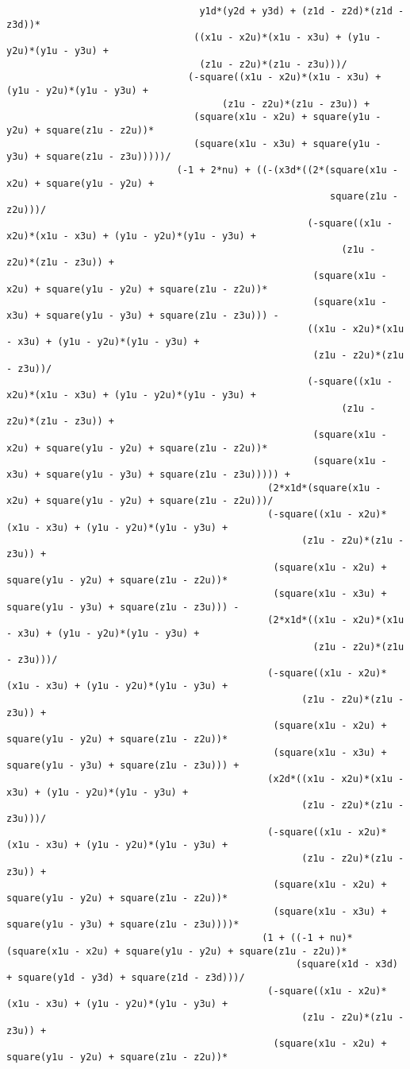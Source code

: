 \begin{lstlisting}
								  y1d*(y2d + y3d) + (z1d - z2d)*(z1d - z3d))*
								 ((x1u - x2u)*(x1u - x3u) + (y1u - y2u)*(y1u - y3u) + 
								  (z1u - z2u)*(z1u - z3u)))/
								(-square((x1u - x2u)*(x1u - x3u) + (y1u - y2u)*(y1u - y3u) + 
									  (z1u - z2u)*(z1u - z3u)) + 
								 (square(x1u - x2u) + square(y1u - y2u) + square(z1u - z2u))*
								 (square(x1u - x3u) + square(y1u - y3u) + square(z1u - z3u)))))/
							  (-1 + 2*nu) + ((-(x3d*((2*(square(x1u - x2u) + square(y1u - y2u) + 
														 square(z1u - z2u)))/
													 (-square((x1u - x2u)*(x1u - x3u) + (y1u - y2u)*(y1u - y3u) + 
														   (z1u - z2u)*(z1u - z3u)) + 
													  (square(x1u - x2u) + square(y1u - y2u) + square(z1u - z2u))*
													  (square(x1u - x3u) + square(y1u - y3u) + square(z1u - z3u))) - 
													 ((x1u - x2u)*(x1u - x3u) + (y1u - y2u)*(y1u - y3u) + 
													  (z1u - z2u)*(z1u - z3u))/
													 (-square((x1u - x2u)*(x1u - x3u) + (y1u - y2u)*(y1u - y3u) + 
														   (z1u - z2u)*(z1u - z3u)) + 
													  (square(x1u - x2u) + square(y1u - y2u) + square(z1u - z2u))*
													  (square(x1u - x3u) + square(y1u - y3u) + square(z1u - z3u))))) + 
											  (2*x1d*(square(x1u - x2u) + square(y1u - y2u) + square(z1u - z2u)))/
											  (-square((x1u - x2u)*(x1u - x3u) + (y1u - y2u)*(y1u - y3u) + 
													(z1u - z2u)*(z1u - z3u)) + 
											   (square(x1u - x2u) + square(y1u - y2u) + square(z1u - z2u))*
											   (square(x1u - x3u) + square(y1u - y3u) + square(z1u - z3u))) - 
											  (2*x1d*((x1u - x2u)*(x1u - x3u) + (y1u - y2u)*(y1u - y3u) + 
													  (z1u - z2u)*(z1u - z3u)))/
											  (-square((x1u - x2u)*(x1u - x3u) + (y1u - y2u)*(y1u - y3u) + 
													(z1u - z2u)*(z1u - z3u)) + 
											   (square(x1u - x2u) + square(y1u - y2u) + square(z1u - z2u))*
											   (square(x1u - x3u) + square(y1u - y3u) + square(z1u - z3u))) + 
											  (x2d*((x1u - x2u)*(x1u - x3u) + (y1u - y2u)*(y1u - y3u) + 
													(z1u - z2u)*(z1u - z3u)))/
											  (-square((x1u - x2u)*(x1u - x3u) + (y1u - y2u)*(y1u - y3u) + 
													(z1u - z2u)*(z1u - z3u)) + 
											   (square(x1u - x2u) + square(y1u - y2u) + square(z1u - z2u))*
											   (square(x1u - x3u) + square(y1u - y3u) + square(z1u - z3u))))*
											 (1 + ((-1 + nu)*(square(x1u - x2u) + square(y1u - y2u) + square(z1u - z2u))*
												   (square(x1d - x3d) + square(y1d - y3d) + square(z1d - z3d)))/
											  (-square((x1u - x2u)*(x1u - x3u) + (y1u - y2u)*(y1u - y3u) + 
													(z1u - z2u)*(z1u - z3u)) + 
											   (square(x1u - x2u) + square(y1u - y2u) + square(z1u - z2u))*

\end{lstlisting}
